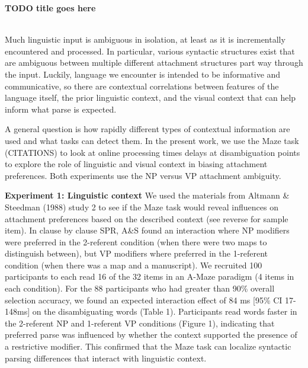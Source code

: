 \documentclass[11pt,a4paper]{article}
\renewcommand{\title}[1]{\textbf{#1}\\}
\newcommand{\authors}[1]{\iftoggle{anonymous}{\phantom{#1}}{#1}\\}
\begin{document}

\noindent\title{TODO title goes here}
\authors{Veronica Boyce (Stanford University, vboyce@stanford.edu), Roger P. Levy (MIT)} 
\newline

Much linguistic input is ambiguous in isolation, at least as it is incrementally encountered and processed. In particular, various syntactic structures exist that are ambiguous between multiple different attachment structures part way through the input.
Luckily, language we encounter is intended to be informative and communicative, so there are contextual correlations between features of the language itself, the prior linguistic context, and the visual context that can help inform what parse is expected. 

A general question is how rapidly different types of contextual information are used and what tasks can detect them. In the present work, we use the Maze task (CITATIONS) to look at online processing times delays at disambiguation points to explore the role of linguistic and visual context in biasing attachment preferences. Both experiments use the NP versus VP attachment ambiguity. 

\medskip
\noindent\textbf{Experiment 1: Linguistic context} We used the materials from Altmann \& Steedman (1988) study 2
 to see if the Maze task would reveal influences on attachment preferences based on the described context (see reverse for sample item). In clause by clause SPR, A\&S found an interaction where NP modifiers were preferred in the 2-referent condition (when there were two maps to distinguish between), but VP modifiers where preferred in the 1-referent condition (when there was a map and a manuscript). We recruited 100 participants to each read 16 of the 32 items in an A-Maze paradigm (4 items in each condition). For the 88 participants who had greater than 90\% overall selection accuracy, we found an expected interaction effect of 84 ms [95\% CI 17-148ms] on the disambiguating words (Table 1). Participants read words faster in the 2-referent NP and 1-referent VP conditions (Figure 1), indicating that preferred parse was influenced by whether the context supported the presence of a restrictive modifier.  This confirmed that the Maze task can localize syntactic parsing differences that interact with linguistic context. 
\end{document}
